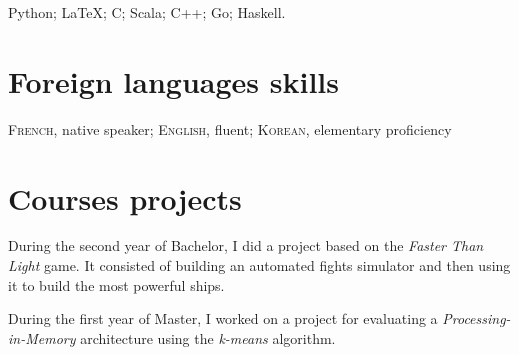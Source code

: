\documentclass[10pt, a4paper]{article}
\begin{document}
Python; \LaTeX{}; C\@; Scala; C++; Go; Haskell.

\section*{Foreign languages skills}
\textsc{French}, native speaker;\hfill
\textsc{English}, fluent;\hfill
\textsc{Korean}, elementary proficiency

\section*{Courses projects}
During the second year of Bachelor, I did a project based on the \textit{Faster Than Light} game. It consisted of building an automated fights simulator and then using it to build the most powerful ships.

During the first year of Master, I worked on a project for evaluating a \textit{Processing-in-Memory} architecture using the \textit{k-means} algorithm.
\end{document}
